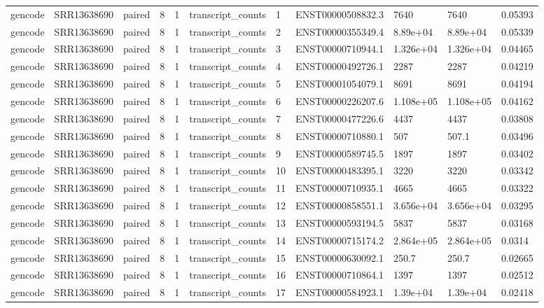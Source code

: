 \begin{tabular}{lllllllllll}
gencode & SRR13638690 & paired & 8 & 1 & transcript\_counts & 1 & ENST00000508832.3 & 7640 & 7640 & 0.05393 \\
gencode & SRR13638690 & paired & 8 & 1 & transcript\_counts & 2 & ENST00000355349.4 & 8.89e+04 & 8.89e+04 & 0.05339 \\
gencode & SRR13638690 & paired & 8 & 1 & transcript\_counts & 3 & ENST00000710944.1 & 1.326e+04 & 1.326e+04 & 0.04465 \\
gencode & SRR13638690 & paired & 8 & 1 & transcript\_counts & 4 & ENST00000492726.1 & 2287 & 2287 & 0.04219 \\
gencode & SRR13638690 & paired & 8 & 1 & transcript\_counts & 5 & ENST00001054079.1 & 8691 & 8691 & 0.04194 \\
gencode & SRR13638690 & paired & 8 & 1 & transcript\_counts & 6 & ENST00000226207.6 & 1.108e+05 & 1.108e+05 & 0.04162 \\
gencode & SRR13638690 & paired & 8 & 1 & transcript\_counts & 7 & ENST00000477226.6 & 4437 & 4437 & 0.03808 \\
gencode & SRR13638690 & paired & 8 & 1 & transcript\_counts & 8 & ENST00000710880.1 & 507 & 507.1 & 0.03496 \\
gencode & SRR13638690 & paired & 8 & 1 & transcript\_counts & 9 & ENST00000589745.5 & 1897 & 1897 & 0.03402 \\
gencode & SRR13638690 & paired & 8 & 1 & transcript\_counts & 10 & ENST00000483395.1 & 3220 & 3220 & 0.03342 \\
gencode & SRR13638690 & paired & 8 & 1 & transcript\_counts & 11 & ENST00000710935.1 & 4665 & 4665 & 0.03322 \\
gencode & SRR13638690 & paired & 8 & 1 & transcript\_counts & 12 & ENST00000858551.1 & 3.656e+04 & 3.656e+04 & 0.03295 \\
gencode & SRR13638690 & paired & 8 & 1 & transcript\_counts & 13 & ENST00000593194.5 & 5837 & 5837 & 0.03168 \\
gencode & SRR13638690 & paired & 8 & 1 & transcript\_counts & 14 & ENST00000715174.2 & 2.864e+05 & 2.864e+05 & 0.0314 \\
gencode & SRR13638690 & paired & 8 & 1 & transcript\_counts & 15 & ENST00000630092.1 & 250.7 & 250.7 & 0.02665 \\
gencode & SRR13638690 & paired & 8 & 1 & transcript\_counts & 16 & ENST00000710864.1 & 1397 & 1397 & 0.02512 \\
gencode & SRR13638690 & paired & 8 & 1 & transcript\_counts & 17 & ENST00000584923.1 & 1.39e+04 & 1.39e+04 & 0.02418 \\

\end{tabular}
